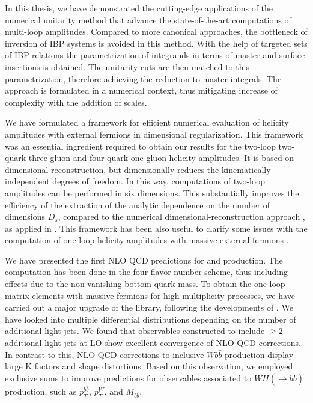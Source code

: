 In this thesis, we have demonstrated the cutting-edge applications of the numerical unitarity method \cite{Abreu:2017hqn,Abreu:2017idw,Abreu:2017xsl,Ita:2015tya,Ellis:2008ir,Ellis:2007br,Giele:2008ve}
that advance the state-of-the-art computations of multi-loop amplitudes.
Compared to more canonical approaches, the bottleneck of inversion of IBP systems is avoided in this method.
With the help of targeted sets of IBP relations 
the parametrization of integrands in terms of master and surface insertions is obtained.
The unitarity cuts are then matched to this parametrization, therefore achieving the reduction to master integrals.
The approach is formulated in a numerical context, thus mitigating increase of complexity with the addition of scales.

We have formulated a framework for efficient numerical evaluation of helicity amplitudes with external fermions in dimensional regularization.
This framework was an essential ingredient required to obtain our results for the two-loop 
two-quark three-gluon and four-quark one-gluon helicity amplitudes.
It is based on dimensional reconstruction, but dimensionally
reduces the kinematically-independent degrees of freedom.
In this way, computations of two-loop amplitudes can be performed in six dimensions.
This substantially improves the efficiency of the extraction of the analytic dependence on the
number of dimensions $D_s$, compared to the numerical dimensional-reconstruction approach \cite{Giele:2008ve,Ellis:2008ir, Boughezal:2011br}, as applied
in \cite{Abreu:2017xsl,Abreu:2017hqn,Badger:2018gip,Abreu:2018jgq}.
This framework has been also useful to clarify some issues with the computation of one-loop helicity amplitudes
with massive external fermions \cite{Anger:2018ove}.

We have presented the first NLO QCD predictions for \Wbbjj{} and \Wbbjjj{} production.
The computation has been done in the four-flavor-number scheme, thus including effects due to the non-vanishing bottom-quark mass.
To obtain the one-loop matrix elements with massive fermions for high-multiplicity processes,
we have carried out a major upgrade of the \BlackHat{} library, following the developments of \cite{Ellis:2008ir}.
We have looked into multiple differential distributions depending on the number of additional light jets.
We found that observables constructed to include $\geq2$ additional light jets at LO
show excellent convergence of NLO QCD corrections.
In contrast to this, NLO QCD corrections to inclusive $Wb\bar{b}$ production display large K factors and shape distortions.
Based on this observation, we employed exclusive sums to improve predictions for observables associated to $WH(\rightarrow b{\bar b})$
production, such as $p_T^{b\bar b}$, $p_T^W$, and $M_{b\bar b}$.

